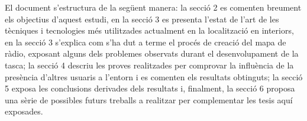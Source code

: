 El document s'estructura de la següent manera: la secció 2 es comenten breument els objectius d'aquest estudi, en la secció 3 es presenta l'estat de l'art de les tècniques i tecnologies més utilitzades actualment en la localització en interiors, en la secció 3 s'explica com s'ha dut a terme el procés de creació del mapa de ràdio, exposant alguns dels problemes observats durant el desenvolupament de la tasca; la secció 4 descriu les proves realitzades per comprovar la influència de la presència d'altres usuaris a l'entorn i es comenten els resultats obtinguts; la secció 5 exposa les conclusions derivades dels resultats i, finalment, la secció 6 proposa una sèrie de possibles futurs treballs a realitzar per complementar les tesis aquí exposades.
